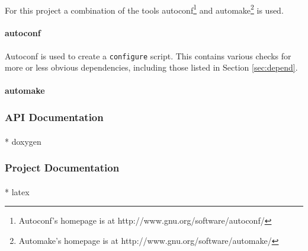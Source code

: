 \paragraph{}
For this project a combination of the tools autoconf\footnote{Autoconf's homepage is at http://www.gnu.org/software/autoconf/} and automake\footnote{Automake's homepage is at http://www.gnu.org/software/automake/} is used.

\paragraph{autoconf}
Autoconf is used to create a \texttt{configure} script. This contains various checks for more or less obvious dependencies, including those listed in Section \ref{sec:depend}.

\paragraph{automake}


\subsubsection{API Documentation}
\paragraph{}
* doxygen


\subsubsection{Project Documentation}
\paragraph{}
* latex

